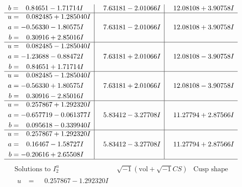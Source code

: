 \documentclass[1p]{elsarticle_modified}
\theoremstyle{definition}
\newcommand{\I}{\sqrt{-1}}
\begin{document}
$$\begin{array}{c|c|c}
\begin{aligned}
b &= \phantom{-}0.84651 - 1.71714 I\end{aligned}
 & \phantom{-}7.63181 - 2.01066 I & \phantom{-}12.08108 + 3.90758 I \\ \hline\begin{aligned}
u &= \phantom{-}0.082485 + 1.285040 I \\
a &= -0.56330 - 1.80575 I \\
b &= \phantom{-}0.30916 + 2.85016 I\end{aligned}
 & \phantom{-}7.63181 - 2.01066 I & \phantom{-}12.08108 + 3.90758 I \\ \hline\begin{aligned}
u &= \phantom{-}0.082485 - 1.285040 I \\
a &= -1.23688 - 0.88472 I \\
b &= \phantom{-}0.84651 + 1.71714 I\end{aligned}
 & \phantom{-}7.63181 + 2.01066 I & \phantom{-}12.08108 - 3.90758 I \\ \hline\begin{aligned}
u &= \phantom{-}0.082485 - 1.285040 I \\
a &= -0.56330 + 1.80575 I \\
b &= \phantom{-}0.30916 - 2.85016 I\end{aligned}
 & \phantom{-}7.63181 + 2.01066 I & \phantom{-}12.08108 - 3.90758 I \\ \hline\begin{aligned}
u &= \phantom{-}0.257867 + 1.292320 I \\
a &= -0.657719 - 0.061377 I \\
b &= \phantom{-}0.095618 - 0.339940 I\end{aligned}
 & \phantom{-}5.83412 - 3.27708 I & \phantom{-}11.27794 + 2.87566 I \\ \hline\begin{aligned}
u &= \phantom{-}0.257867 + 1.292320 I \\
a &= \phantom{-}0.16467 - 1.58727 I \\
b &= -0.20616 + 2.65508 I\end{aligned}
 & \phantom{-}5.83412 - 3.27708 I & \phantom{-}11.27794 + 2.87566 I\\
 \hline 
 \end{array}$$\newpage$$\begin{array}{c|c|c}  
\text{Solutions to }I^u_{2}& \I (\text{vol} + \sqrt{-1}CS) & \text{Cusp shape}\\
 \hline 
\begin{aligned}
u &= \phantom{-}0.257867 - 1.292320 I \\

\end{aligned}
\end{array}$$
\end{document}
